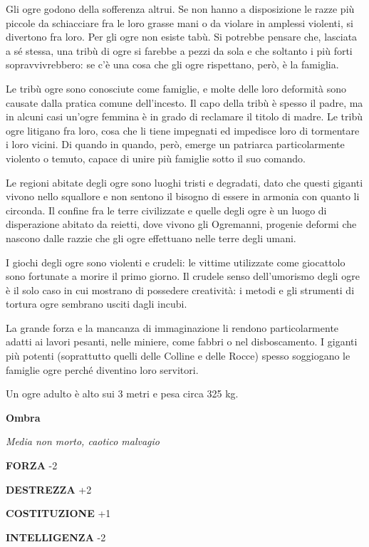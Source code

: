 \begin{multicols}{2}
	Gli ogre godono della sofferenza altrui. Se non hanno a disposizione le razze più piccole da schiacciare fra le loro grasse mani o da violare in amplessi violenti, si divertono fra loro. Per gli ogre non esiste tabù. Si potrebbe pensare che, lasciata a sé stessa, una tribù di ogre si farebbe a pezzi da sola e che soltanto i più forti sopravvivrebbero: se c'è una cosa che gli ogre rispettano, però, è la famiglia.

	Le tribù ogre sono conosciute come famiglie, e molte delle loro deformità sono causate dalla pratica comune dell'incesto. Il capo della tribù è spesso il padre, ma in alcuni casi un'ogre femmina è in grado di reclamare il titolo di madre. Le tribù ogre litigano fra loro, cosa che li tiene impegnati ed impedisce loro di tormentare i loro vicini. Di quando in quando, però, emerge un patriarca particolarmente violento o temuto, capace di unire più famiglie sotto il suo comando.

	Le regioni abitate degli ogre sono luoghi tristi e degradati, dato che questi giganti vivono nello squallore e non sentono il bisogno di essere in armonia con quanto li circonda. Il confine fra le terre civilizzate e quelle degli ogre è un luogo di disperazione abitato da reietti, dove vivono gli Ogremanni, progenie deformi che nascono dalle razzie che gli ogre effettuano nelle terre degli umani.

	I giochi degli ogre sono violenti e crudeli: le vittime utilizzate come giocattolo sono fortunate a morire il primo giorno. Il crudele senso dell'umorismo degli ogre è il solo caso in cui mostrano di possedere creatività: i metodi e gli strumenti di tortura ogre sembrano usciti dagli incubi.

	La grande forza e la mancanza di immaginazione li rendono particolarmente adatti ai lavori pesanti, nelle miniere, come fabbri o nel disboscamento. I giganti più potenti (soprattutto quelli delle Colline e delle Rocce) spesso soggiogano le famiglie ogre perché diventino loro servitori.

	Un ogre adulto è alto sui 3 metri e pesa circa 325 kg.


	\medskip{}\textbf{Ombra}

	\textit{Media non morto, caotico malvagio}

	\textbf{FORZA} -2

	\textbf{DESTREZZA} +2

	\textbf{COSTITUZIONE} +1

	\textbf{INTELLIGENZA} -2


\end{multicols}
